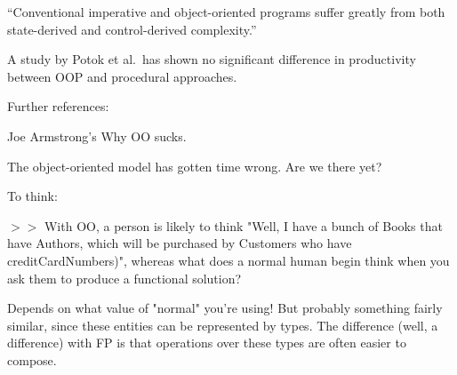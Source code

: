 \documentclass{article}
\begin{document}
\enquote{Conventional imperative and object-oriented programs suffer greatly
from both state-derived and control-derived complexity.}\cite{MM06}

A study by Potok et al.\ has shown no significant difference in productivity
between OOP and procedural approaches\cite{Pot99}.

Further references:

Joe Armstrong's Why OO sucks\cite{Arm01}.

The object-oriented model has gotten time wrong.
Are we there yet?\cite{Hic09}




To think:
\begin{center}
\(>>\) With OO, a person is likely to think "Well, I have a bunch of Books
that have Authors, which will be purchased by Customers who have
creditCardNumbers)", whereas what does a normal human begin think when you
ask them to produce a functional solution?

Depends on what value of "normal" you're using! But probably something fairly
similar, since these entities can be represented by types. The difference
(well, a difference) with FP is that operations over these types are often
easier to compose.
\end{center}


%
%
\printbibliography
\end{document}
